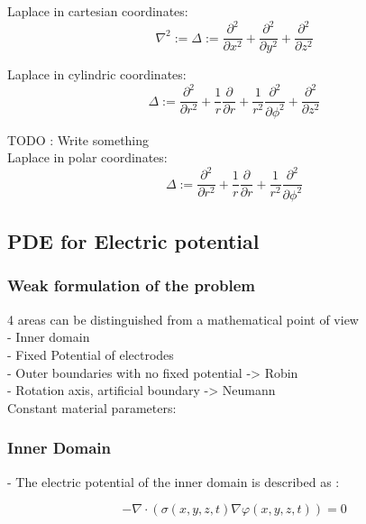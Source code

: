 \documentclass[parskip=half, titlepage=yes, 12pt, BCOR=12mm, DIV=calc]{scrartcl}
\begin{document}
Laplace in cartesian coordinates:
\begin{equation}
    \nabla^2 := \Delta := \frac{\partial^2}{\partial x^2} + \frac{\partial^2}{\partial y^2} + \frac{\partial^2}{\partial z^2}
\end{equation}

Laplace in cylindric coordinates:
\begin{equation}
    \Delta := \frac{\partial^2}{\partial r^2} + \frac{1}{r} \frac{\partial}{\partial r} + \frac{1}{r^2} \frac{\partial^2}{\partial \phi^2} + \frac{\partial^2}{\partial z^2}
\end{equation}

TODO : Write something \\

Laplace in polar coordinates:
\begin{equation}
    \Delta := \frac{\partial^2}{\partial r^2} + \frac{1}{r} \frac{\partial}{\partial r} + \frac{1}{r^2} \frac{\partial^2}{\partial \phi^2}
\end{equation}



\subsection{PDE for Electric potential}

\subsubsection{Weak formulation of the problem}
4 areas can be distinguished from a mathematical point of view \\
- Inner domain \\
- Fixed Potential of electrodes \\
- Outer boundaries with no fixed potential -> Robin \\
- Rotation axis, artificial boundary -> Neumann \\

Constant material parameters: \\

\subsubsection{Inner Domain}

- The electric potential of the inner domain is described as : 

\begin{equation}
    - \nabla \cdot (\sigma(x,y,z,t) \nabla \varphi(x,y,z,t)) = 0
\end{equation}
\end{document}
